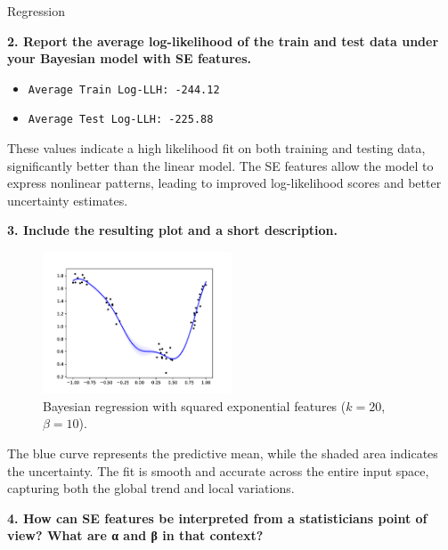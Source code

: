 \documentclass[
	english,
        solution=true
	]{tudaexercise}
\begin{document}
\begin{task}[points=34]{Regression}
\begin{subtask}[points=8, title=Squared Exponential Features]
\begin{solution}
            \vspace{2em}

            \textbf{2. Report the average log-likelihood of the train and test data under your Bayesian model with SE features.}

            \begin{itemize}
                \item \texttt{Average Train Log-LLH: -244.12}
                \item \texttt{Average Test Log-LLH: -225.88}
            \end{itemize}

            These values indicate a high likelihood fit on both training and testing data, significantly better than the linear model.
            The SE features allow the model to express nonlinear patterns, leading to improved log-likelihood scores and better uncertainty estimates.

            \vspace{2em}

            \textbf{3. Include the resulting plot and a short description.}

            \begin{figure}[H]
                \centering
                \includegraphics[width=0.5\textwidth]{images/Task1d_3.png}
                \caption{Bayesian regression with squared exponential features ($k=20$, $\beta=10$).}
            \end{figure}

            The blue curve represents the predictive mean, while the shaded area indicates the uncertainty.
            The fit is smooth and accurate across the entire input space, capturing both the global trend and local variations.

            \vspace{2em}

            \textbf{4. How can SE features be interpreted from a statisticians point of view? What are α and β in that context?}


\end{solution}
\end{subtask}
\end{task}
\end{document}
